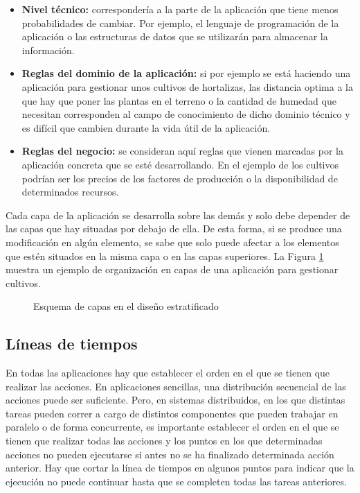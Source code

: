 \begin{itemize}
   \item \textbf{Nivel técnico:} correspondería a la parte de la aplicación que tiene menos probabilidades de cambiar. Por ejemplo, el lenguaje de programación de la aplicación o las estructuras de datos que se utilizarán para almacenar la información.
   \item \textbf{Reglas del dominio de la aplicación:} si por ejemplo se está haciendo una aplicación para gestionar unos cultivos de hortalizas, las distancia optima a la que hay que poner las plantas en el terreno o la cantidad de humedad que necesitan corresponden al campo de conocimiento de dicho dominio técnico y es difícil que cambien durante la vida útil de la aplicación.
   \item \textbf{Reglas del negocio:} se consideran aquí reglas que vienen marcadas por la aplicación concreta que se esté desarrollando. En el ejemplo de los cultivos podrían ser los precios de los factores de producción o la disponibilidad de determinados recursos.
\end{itemize}

Cada capa de la aplicación se desarrolla sobre las demás y solo debe depender de las capas que hay situadas por debajo de ella. De esta forma, si se produce una modificación en algún elemento, se sabe que solo puede afectar a los elementos que estén situados en la misma capa o en las capas superiores. La Figura \ref{fig_stratified} muestra un ejemplo de organización en capas de una aplicación para gestionar cultivos.

\vspace{1em}
\begin{figure}[htb]
   \centering {}
   \caption{Esquema de capas en el diseño estratificado}
   \label{fig_stratified}
\end{figure}

\subsection{Líneas de tiempos}
En todas las aplicaciones hay que establecer el orden en el que se tienen que realizar las acciones. En aplicaciones sencillas, una distribución secuencial de las acciones puede ser suficiente. Pero, en sistemas distribuidos, en los que distintas tareas pueden correr a cargo de distintos componentes que pueden trabajar en paralelo o de forma concurrente, es importante establecer el orden en el que se tienen que realizar todas las acciones y los puntos en los que determinadas acciones no pueden ejecutarse si antes no se ha finalizado determinada acción anterior. Hay que cortar la línea de tiempos en algunos puntos para indicar que la ejecución no puede continuar hasta que se completen todas las tareas anteriores.

